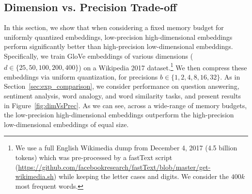 
\subsection{Dimension vs. Precision Trade-off}
\label{sec:dim_vs_prec}
%
In this section, we show that when considering a fixed memory budget for uniformly quantized embeddings, low-precision high-dimensional embeddings perform significantly better than high-precision low-dimensional embeddings.
Specifically, we train GloVe embeddings of various dimensions ($d\in\{25,50,100,200,400\}$) on a Wikipedia 2017 dataset.\footnote{We use a full English Wikimedia dump from December 4, 2017 (4.5 billion tokens) which was pre-processed by a fastText script (\url{https://github.com/facebookresearch/fastText/blob/master/get-wikimedia.sh}) while keeping the letter cases and digits.
We consider the $400k$ most frequent words.}
We then compress these embeddings via uniform quantization, for precisions $b\in\{1,2,4,8,16,32\}$.
As in Section~\ref{sec:exp_comparison}, we consider performance on question answering, sentiment analysis, word analogy, and word similarity tasks, and present results in Figure~\ref{fig:dimVsPrec}.
As we can see, across a wide-range of memory budgets, the low-precision high-dimensional embeddings outperform the high-precision low-dimensional embeddings of equal size.
